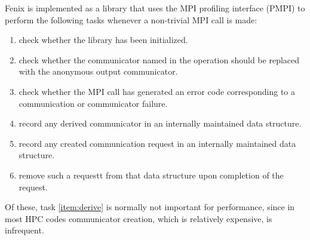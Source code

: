 Fenix is implemented as a library that uses the MPI profiling interface (PMPI) to
perform the following tasks whenever a non-trivial MPI call is made:
\begin{enumerate}
\item check whether the library has been initialized.
\item check whether the communicator named in the operation should be replaced with
  the anonymous output communicator.
\item check whether the MPI call has generated an error code corresponding to a
  communication or communicator failure.
\item record any derived communicator in an internally maintained data structure.\label{item:derive}
\item record any created communication request in an internally maintained data structure.
\item remove such a requestt from that data structure upon completion of the request.
\end{enumerate}
Of these, task \ref{item:derive} is normally not important for performance, since
in most HPC codes communicator creation, which is relatively expensive, is infrequent.

